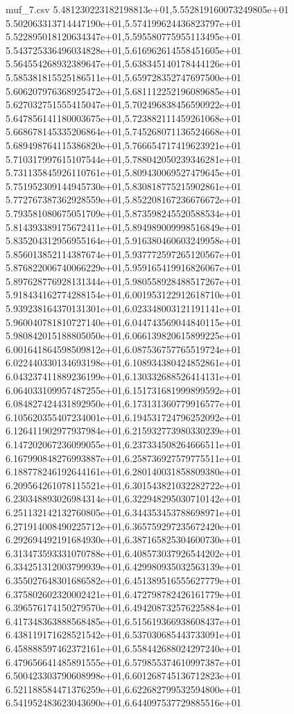 \begin{filecontents*}{muf_7.csv}
5.481230223182198813e+01,5.552819160073249805e+01
5.502063313714447190e+01,5.574199624436823797e+01
5.522895018120634347e+01,5.595580775955113495e+01
5.543725336496034828e+01,5.616962614558451605e+01
5.564554268932389647e+01,5.638345140178444126e+01
5.585381815525186511e+01,5.659728352747697500e+01
5.606207976368925472e+01,5.681112252196089685e+01
5.627032751555415047e+01,5.702496838456590922e+01
5.647856141180003675e+01,5.723882111459261068e+01
5.668678145335206864e+01,5.745268071136524668e+01
5.689498764115386820e+01,5.766654717419623921e+01
5.710317997615107544e+01,5.788042050239346281e+01
5.731135845926110761e+01,5.809430069527479645e+01
5.751952309144945730e+01,5.830818775215902861e+01
5.772767387362928559e+01,5.852208167236676672e+01
5.793581080675051709e+01,5.873598245520588534e+01
5.814393389175672411e+01,5.894989009998516849e+01
5.835204312956955164e+01,5.916380460603249958e+01
5.856013852114387674e+01,5.937772597265120567e+01
5.876822006740066229e+01,5.959165419916826067e+01
5.897628776928131344e+01,5.980558928488517267e+01
5.918434162774288154e+01,6.001953122912618710e+01
5.939238164370131301e+01,6.023348003121191141e+01
5.960040781810727140e+01,6.044743569044840115e+01
5.980842015188805050e+01,6.066139820615899225e+01
6.001641864598509812e+01,6.087536757765519724e+01
6.022440330134693198e+01,6.108934380424852861e+01
6.043237411889236199e+01,6.130332688526414131e+01
6.064033109957487255e+01,6.151731681999899592e+01
6.084827424431892950e+01,6.173131360779916577e+01
6.105620355407234001e+01,6.194531724796252092e+01
6.126411902977937984e+01,6.215932773980330239e+01
6.147202067236099055e+01,6.237334508264666511e+01
6.167990848276993887e+01,6.258736927579775511e+01
6.188778246192644161e+01,6.280140031858809380e+01
6.209564261078115521e+01,6.301543821032282722e+01
6.230348893026984314e+01,6.322948295030710142e+01
6.251132142132760805e+01,6.344353453788698971e+01
6.271914008490225712e+01,6.365759297235672420e+01
6.292694492191684930e+01,6.387165825304600730e+01
6.313473593331070788e+01,6.408573037926544202e+01
6.334251312003799939e+01,6.429980935032563139e+01
6.355027648301686582e+01,6.451389516555627779e+01
6.375802602320002421e+01,6.472798782426161779e+01
6.396576174150279570e+01,6.494208732576225884e+01
6.417348363888568485e+01,6.515619366938608437e+01
6.438119171628521542e+01,6.537030685443733091e+01
6.458888597462372161e+01,6.558442688024297240e+01
6.479656641485891555e+01,6.579855374610997387e+01
6.500423303790608998e+01,6.601268745136712823e+01
6.521188584471376259e+01,6.622682799532594800e+01
6.541952483623043690e+01,6.644097537729885516e+01

\end{filecontents*}
